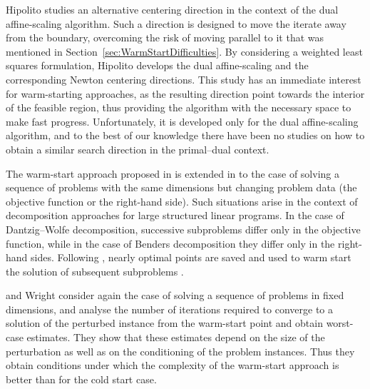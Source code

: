 Hipolito \cite{Hipolito} studies an alternative centering direction 
in the context of the dual affine-scaling algorithm. Such a 
direction is designed to move the iterate away from the boundary, 
overcoming the risk of moving parallel to it that was mentioned 
in Section~\ref{sec:WarmStartDifficulties}. 
By considering a weighted least squares formulation, Hipolito 
develops the dual affine-scaling and the corresponding Newton 
centering directions. 
This study has an immediate interest for warm-starting approaches,
as the resulting direction point towards the interior of the 
feasible region, thus providing the algorithm with the necessary 
space to make fast progress. 
Unfortunately, it is developed only for the dual affine-scaling 
algorithm, and to the best of our knowledge there have been no 
studies on how to obtain a similar search direction in the 
primal--dual context.

The warm-start approach proposed in \cite{Gondzio98} is extended
in \cite{GondzioVial} to the case of solving a sequence of problems 
with the same dimensions but changing problem data (the objective 
function or the right-hand side). Such situations arise 
in the context of decomposition approaches for large structured 
linear programs. 
In the case of Dantzig--Wolfe decomposition, successive subproblems 
differ only in the objective function, while in the case 
of Benders decomposition they differ only in the right-hand sides.
Following \cite{Gondzio98}, nearly optimal points are saved and used 
to warm start the solution of subsequent subproblems \cite{GondzioVial}.


\yildirim and Wright \cite{YildirimWright} consider again the case 
of solving a sequence of problems in fixed dimensions, and
analyse the number of iterations required to converge to a 
solution of the perturbed instance from the warm-start point and 
obtain worst-case estimates.
They show that these estimates depend on the size of the perturbation 
as well as on the conditioning %
of the problem 
instances. Thus they obtain conditions under which the complexity 
of the warm-start approach is better than for the cold start case.

